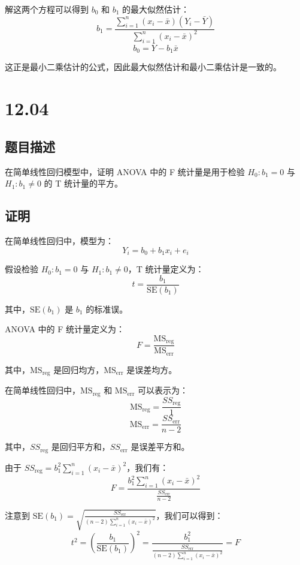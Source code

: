 \documentclass[UTF8]{article}
\theoremstyle{MyLineTheoremStyle} %
\theoremstyle{MyBlockTheoremStyle} %
\theoremstyle{MySubsubsectionStyle} %
\begin{document}
解这两个方程可以得到 $b_0$ 和 $b_1$ 的最大似然估计：
\[
b_1 = \frac{\sum_{i=1}^n (x_i - \bar{x})(Y_i - \bar{Y})}{\sum_{i=1}^n (x_i - \bar{x})^2}
\]
\[
b_0 = \bar{Y} - b_1 \bar{x}
\]

这正是最小二乘估计的公式，因此最大似然估计和最小二乘估计是一致的。






\cleardoublepage

\section{12.04}

\subsection*{题目描述}

在简单线性回归模型中，证明 ANOVA 中的 F 统计量是用于检验 $H_0: b_1 = 0$ 与 $H_1: b_1 \neq 0$ 的 T 统计量的平方。

\subsection*{证明}

在简单线性回归中，模型为：
\[
Y_i = b_0 + b_1 x_i + e_i
\]

假设检验 $H_0: b_1 = 0$ 与 $H_1: b_1 \neq 0$，T 统计量定义为：
\[
t = \frac{b_1}{\text{SE}(b_1)}
\]

其中，$\text{SE}(b_1)$ 是 $b_1$ 的标准误。

ANOVA 中的 F 统计量定义为：
\[
F = \frac{\text{MS}_{\text{reg}}}{\text{MS}_{\text{err}}}
\]

其中，$\text{MS}_{\text{reg}}$ 是回归均方，$\text{MS}_{\text{err}}$ 是误差均方。

在简单线性回归中，$\text{MS}_{\text{reg}}$ 和 $\text{MS}_{\text{err}}$ 可以表示为：
\[
\text{MS}_{\text{reg}} = \frac{SS_{\text{reg}}}{1}
\]
\[
\text{MS}_{\text{err}} = \frac{SS_{\text{err}}}{n-2}
\]

其中，$SS_{\text{reg}}$ 是回归平方和，$SS_{\text{err}}$ 是误差平方和。

由于 $SS_{\text{reg}} = b_1^2 \sum_{i=1}^n (x_i - \bar{x})^2$，我们有：
\[
F = \frac{b_1^2 \sum_{i=1}^n (x_i - \bar{x})^2}{\frac{SS_{\text{err}}}{n-2}}
\]

注意到 $\text{SE}(b_1) = \sqrt{\frac{SS_{\text{err}}}{(n-2) \sum_{i=1}^n (x_i - \bar{x})^2}}$，我们可以得到：
\[
t^2 = \left(\frac{b_1}{\text{SE}(b_1)}\right)^2 = \frac{b_1^2}{\frac{SS_{\text{err}}}{(n-2) \sum_{i=1}^n (x_i - \bar{x})^2}} = F
\]
\end{document}
